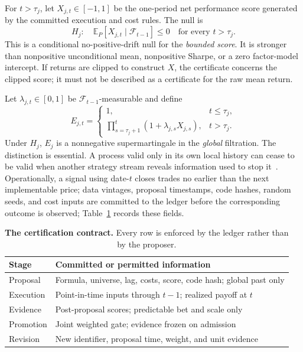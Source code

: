 For \(t>\tau_j\), let \(X_{j,t}\in[-1,1]\) be the one-period net performance
score generated by the committed execution and cost rules.  The null is
\begin{equation}
H_j:\quad
\mathbb E_P[X_{j,t}\mid\mathcal F_{t-1}]\le0
\quad\text{for every }t>\tau_j .
\label{eq:null}
\end{equation}
This is a conditional no-positive-drift null for the \emph{bounded score}.
It is stronger than nonpositive unconditional mean, nonpositive Sharpe, or a
zero factor-model intercept.  If returns are clipped to construct \(X\), the
certificate concerns the clipped score; it must not be described as a
certificate for the raw mean return.

Let \(\lambda_{j,t}\in[0,1]\) be \(\mathcal F_{t-1}\)-measurable and define
\begin{equation}
E_{j,t} =
\begin{cases}
1, & t\le\tau_j,\\
\displaystyle\prod_{s=\tau_j+1}^{t}
       (1+\lambda_{j,s}X_{j,s}), & t>\tau_j.
\end{cases}
\label{eq:eprocess}
\end{equation}
Under \(H_j\), \(E_j\) is a nonnegative supermartingale in the \emph{global}
filtration.  The distinction is essential.  A process valid only in its own
local history can cease to be valid when another strategy stream reveals
information used to stop it~\cite{wang2025stopped}.  Operationally, a signal
using date-\(t\) closes trades no earlier than the next implementable price;
data vintages, proposal timestamps, code hashes, random seeds, and cost inputs
are committed to the ledger before the corresponding outcome is observed;
Table~\ref{tab:contract} records these fields.

\begin{table}[t]
\caption{\textbf{The certification contract.} Every row is enforced by the
ledger rather than by the proposer.}
\label{tab:contract}
\centering
\small
\setlength{\tabcolsep}{3.4pt}
\begin{tabular}{p{}p{}}
\toprule
Stage & Committed or permitted information\\
\midrule
Proposal & Formula, universe, lag, costs, score, code hash; global past only\\
Execution & Point-in-time inputs through \(t-1\); realized payoff at \(t\)\\
Evidence & Post-proposal scores; predictable bet and scale only\\
Promotion & Joint weighted gate; evidence frozen on admission\\
Revision & New identifier, proposal time, weight, and unit evidence\\
\bottomrule
\end{tabular}
\end{table}

